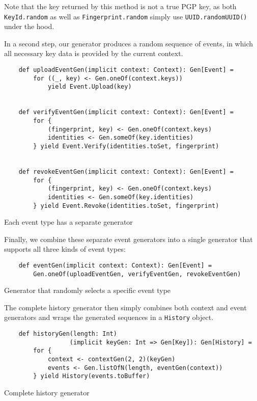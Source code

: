 Note that the key returned by this method is not a true PGP key, as both \texttt{KeyId.random} as well as \texttt{Fingerprint.random} simply use \texttt{UUID.randomUUID()} under the hood. 

In a second step, our generator produces a random sequence of events, in which all necessary key data is provided by the current context.
\begin{code}
    \begin{verbatim}
    def uploadEventGen(implicit context: Context): Gen[Event] =
        for ((_, key) <- Gen.oneOf(context.keys)) 
            yield Event.Upload(key)


    def verifyEventGen(implicit context: Context): Gen[Event] =
        for {
            (fingerprint, key) <- Gen.oneOf(context.keys)
            identities <- Gen.someOf(key.identities)
        } yield Event.Verify(identities.toSet, fingerprint)


    def revokeEventGen(implicit context: Context): Gen[Event] =
        for {
            (fingerprint, key) <- Gen.oneOf(context.keys)
            identities <- Gen.someOf(key.identities)
        } yield Event.Revoke(identities.toSet, fingerprint)
    \end{verbatim}
    \caption{Each event type has a separate generator}
\end{code}


Finally, we combine these separate event generators into a single generator that supports all three kinds of event types:
\begin{code}
    \begin{verbatim}
    def eventGen(implicit context: Context): Gen[Event] =
        Gen.oneOf(uploadEventGen, verifyEventGen, revokeEventGen)
    \end{verbatim}
    \caption{Generator that randomly selects a specific event type}
\end{code}


The complete history generator then simply combines both context and event generators and wraps the generated sequences in a \texttt{History} object.
\begin{code}
    \begin{verbatim}
    def historyGen(length: Int)
                  (implicit keyGen: Int => Gen[Key]): Gen[History] =
        for {
            context <- contextGen(2, 2)(keyGen)
            events <- Gen.listOfN(length, eventGen(context))
        } yield History(events.toBuffer)
    \end{verbatim}
    \caption{Complete history generator}
\end{code}

